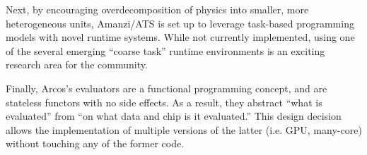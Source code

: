 Next, by encouraging overdecomposition of physics into smaller, more heterogeneous units, Amanzi/ATS is set up to leverage task-based programming models with novel runtime systems.
While not currently implemented, using one of the several emerging ``coarse task'' runtime environments \cite{BauerTSA12,Qingyu,CharmPP} is an exciting research area for the community.

Finally, Arcos's evaluators are a functional programming concept, and are stateless functors with no side effects.
As a result, they abstract ``what is evaluated'' from ``on what data and chip is it evaluated.''
This design decision allows the implementation of multiple versions of the latter (i.e. GPU, many-core) without touching any of the former code.

